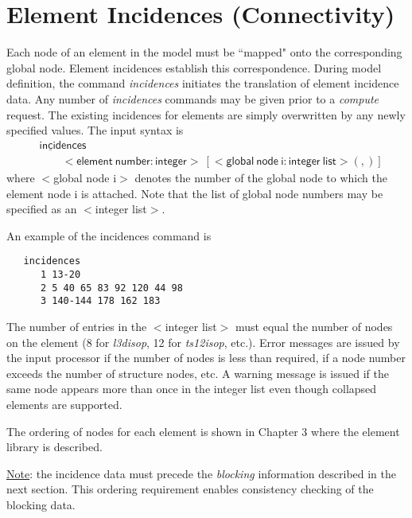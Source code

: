 \documentclass[11pt]{report}
\numberwithin{equation}{section}
\newcommand{\ul} {\underline}
\newcommand{\hv} {\mathsf}   %
\newcommand{\ti}{\emph}
\begin{document}
%
\section{Element Incidences (Connectivity)}
Each node of an element in the model must be ``mapped" onto the corresponding 
global node. Element incidences establish this correspondence. During model 
definition, the command \ti{incidences} initiates the translation of 
element incidence data. Any number of \ti{incidences} commands may 
be given prior to a \ti{compute} request. The existing incidences 
for elements are simply overwritten by any newly specified values. 
The input syntax is
\begin{align*}
&\hv{\ul{incid}ences} \\
&\qquad \hv{<element\ number:integer>\ \left[ <global\ node\ i:integer\ list> (,)\right]}
\end{align*}
\noindent where $<$global node i$>$ denotes the number of the global 
node to which the element node i is attached. 
Note that the list of global node numbers may be specified as an $<$integer list$>$.

\noindent An example of the incidences command is
\small \begin{verbatim}
   incidences 
      1 13-20 
      2 5 40 65 83 92 120 44 98 
      3	140-144 178 162 183
\end{verbatim}\normalsize

\noindent The number of entries in the $<$integer list$>$ must equal the number of nodes 
on the element (8 for \ti{l3disop}, 12 for \ti{ts12isop}, etc.). Error messages are issued 
by the input processor if the number of nodes is less than required, 
if a node number exceeds the number of structure nodes, etc. 
A warning message is issued if the same node appears more 
than once in the integer list even though collapsed elements are supported.

The ordering of nodes for each element is shown in Chapter 3 where the 
element library is described.

\noindent \ul{Note}: the incidence data must precede the \ti{blocking} information 
described in the next section. This ordering requirement enables 
consistency checking of the blocking data.
\end{document}
